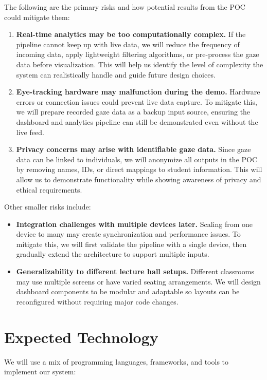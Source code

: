\documentclass{article}
\begin{document}
\noindent
The following are the primary risks and how potential results from the POC could mitigate them:
\begin{enumerate}
  \item \textbf{Real-time analytics may be too computationally complex.} If the pipeline cannot keep up with live data, we will reduce the frequency of incoming data, apply lightweight filtering algorithms, or pre-process the gaze data before visualization. This will help us identify the level of complexity the system can realistically handle and guide future design choices.
  \item \textbf{Eye-tracking hardware may malfunction during the demo.} Hardware errors or connection issues could prevent live data capture. To mitigate this, we will prepare recorded gaze data as a backup input source, ensuring the dashboard and analytics pipeline can still be demonstrated even without the live feed.
  \item \textbf{Privacy concerns may arise with identifiable gaze data.} Since gaze data can be linked to individuals, we will anonymize all outputs in the POC by removing names, IDs, or direct mappings to student information. This will allow us to demonstrate functionality while showing awareness of privacy and ethical requirements.
\end{enumerate}

Other smaller risks include:
\begin{itemize}
  \item \textbf{Integration challenges with multiple devices later.} Scaling from one device to many may create synchronization and performance issues. To mitigate this, we will first validate the pipeline with a single device, then gradually extend the architecture to support multiple inputs.
  \item \textbf{Generalizability to different lecture hall setups.} Different classrooms may use multiple screens or have varied seating arrangements. We will design dashboard components to be modular and adaptable so layouts can be reconfigured without requiring major code changes.
\end{itemize}

\section{Expected Technology}

We will use a mix of programming languages, frameworks, and tools to implement our system:
\end{document}
